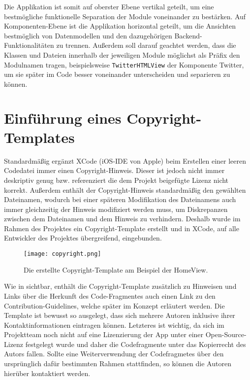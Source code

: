 \noindent Die Applikation ist somit auf oberster Ebene vertikal geteilt, um eine bestmögliche funktionelle Separation der Module voneinander zu bestärken. Auf Komponenten-Ebene ist die Applikation horizontal geteilt, um die Ansichten bestmöglich von Datenmodellen und den dazugehörigen Backend-Funktionalitäten zu trennen. Außerdem soll darauf geachtet werden, dass die Klassen und Dateien innerhalb der jeweiligen Module möglichst als Präfix den Modulnamen tragen, beispielsweise \texttt{TwitterHTMLView} der Komponente Twitter, um sie später im Code besser voneinander unterscheiden und separieren zu können.

\section{Einführung eines Copyright-Templates}

Standardmäßig ergänzt XCode (iOS-IDE von Apple) beim Erstellen einer leeren Codedatei immer einen Copyright-Hinweis. Dieser ist jedoch nicht immer deskriptiv genug bzw. referenziert die dem Projekt beigefügte Lizenz nicht korrekt. Außerdem enthält der Copyright-Hinweis standardmäßig den gewählten Dateinamen, wodurch bei einer späteren Modifikation des Dateinamens auch immer gleichzeitig der Hinweis modifiziert werden muss, um Diskrepanzen zwischen dem Dateinamen und dem Hinweis zu verhindern. Deshalb wurde im Rahmen des Projektes ein Copyright-Template erstellt und in XCode, auf alle Entwickler des Projektes übergreifend, eingebunden.

\begin{figure}[H]
\texttt{[image: copyright.png]}
\caption{Die erstellte Copyright-Template am Beispiel der HomeView.}\label{fig:copyright}
\end{figure}

\noindent Wie in  sichtbar, enthält die Copyright-Template zusätzlich zu Hinweisen und Links über die Herkunft des Code-Fragmentes auch einen Link zu den Contribution-Guidelines, welche später im Konzept erläutert werden. Die Template ist bewusst so ausgelegt, dass sich mehrere Autoren inklusive ihrer Kontaktinformationen eintragen können. Letzteres ist wichtig, da sich im Projektteam noch nicht auf eine Lizenzierung der App unter einer Open-Source-Lizenz festgelegt wurde und daher die Codefragmente unter das Kopierrecht des Autors fallen. Sollte eine Weiterverwendung der Codefragmetes über den ursprünglich dafür bestimmten Rahmen stattfinden, so können die Autoren hierüber kontaktiert werden.


